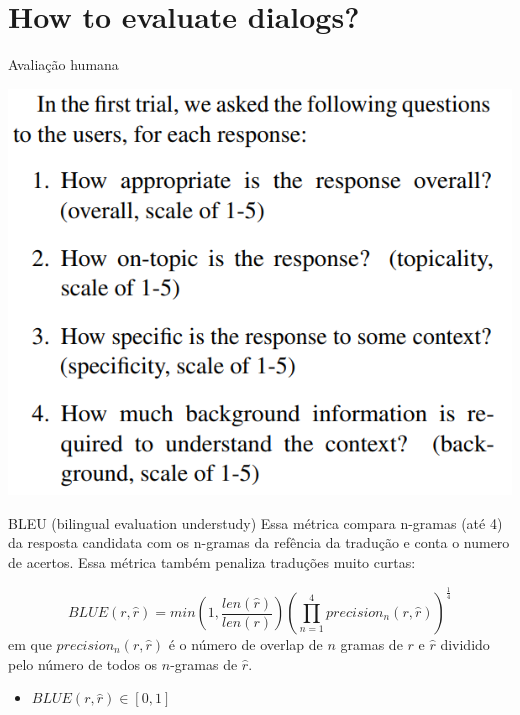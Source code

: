 \documentclass[10pt]{beamer}
\begin{document}
\section{How to evaluate dialogs?}


\begin{frame}{Avaliação humana \cite{Lowe:2016}}
\begin{center}
\includegraphics[scale=0.4]{images/exemploEval1.png}
\end{center}
\end{frame}




\begin{frame}{BLEU (bilingual evaluation understudy) \cite{Papineni2001}}
Essa métrica compara n-gramas (até 4) da resposta candidata com os n-gramas da refência da tradução e conta o numero de acertos. Essa métrica também penaliza traduções muito curtas:

\begin{equation*}
BLUE(r, \hat{r}) = min \left(1, \frac{len(\hat{r})}{len(r)} \right) \left(\prod_{n=1}^{4} precision_{n}(r, \hat{r}) \right)^{\frac{1}{4}}
\end{equation*}
em que $ precision_{n}(r, \hat{r})$ é o número de overlap de $n$ gramas de $r$ e $\hat{r}$ dividido pelo número de todos os $n$-gramas de $\hat{r}$. 

\begin{itemize}
\item $BLUE(r, \hat{r}) \in [0,1]$
\end{itemize}
\end{frame}
\end{document}
